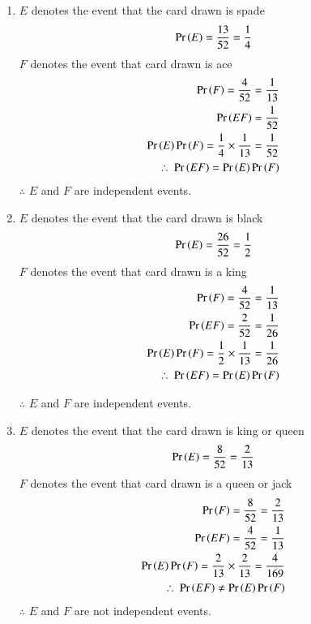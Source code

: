 \documentclass[12pt, journal]{IEEEtran}
\begin{document}
	\begin{enumerate}[label=(\roman*)]
		\item 
			$E$ denotes the event that the card drawn is spade
			\begin{align}
				\Pr\left(E\right) = \frac{13}{52} = \frac{1}{4} 
			\end{align}
			$F$ denotes the event that card drawn is ace 
			\begin{align}
				\Pr\left(F\right) = \frac{4}{52} = \frac{1}{13}\\
				\Pr\left(EF\right) = \frac{1}{52}\\
				\Pr\left(E\right)\Pr\left(F\right) = \frac{1}{4} \times \frac{1}{13} = \frac{1}{52}\\
				\therefore~\Pr\left(EF\right) = \Pr\left(E\right)\Pr\left(F\right)
			\end{align}
			$\therefore$  $E$ and $F$ are independent events. \\
		\item
			$E$ denotes the event that the card drawn is black 
			\begin{align}
				\Pr\left(E\right) = \frac{26}{52} = \frac{1}{2}
			\end{align}
			$F$ denotes the event that card drawn is a king 
			\begin{align}
				\Pr\left(F\right) = \frac{4}{52} = \frac{1}{13} \\
				\Pr\left(EF\right) = \frac{2}{52} = \frac{1}{26} \\
				\Pr\left(E\right)\Pr\left(F\right) = \frac{1}{2} \times \frac{1}{13} = \frac{1}{26}\\
				\therefore~\Pr\left(EF\right) = \Pr\left(E\right)\Pr\left(F\right)
			\end{align}
			
			$\therefore$  $E$ and $F$ are independent events. \\
		\item
			$E$ denotes the event that the card drawn is king or queen
			\begin{align}
				\Pr\left(E\right) = \frac{8}{52} = \frac{2}{13}
			\end{align}
			$F$ denotes the event that card drawn is a queen or jack 
			\begin{align}
				\Pr\left(F\right) = \frac{8}{52} = \frac{2}{13}\\
				\Pr\left(EF\right) = \frac{4}{52} = \frac{1}{13}\\
				\Pr\left(E\right)\Pr\left(F\right) = \frac{2}{13} \times \frac{2}{13} = \frac{4}{169}\\
				\therefore~\Pr\left(EF\right) \neq \Pr\left(E\right)\Pr\left(F\right)
			\end{align}	
			$\therefore$  $E$ and $F$ are not independent events. \\
		
	\end{enumerate}
\end{document}
